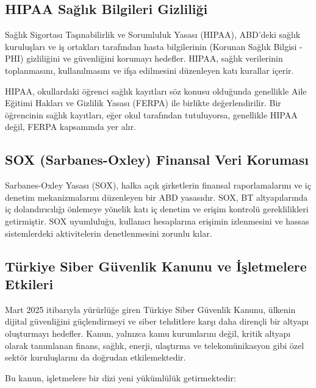 \subsection{HIPAA Sağlık Bilgileri Gizliliği}

Sağlık Sigortası Taşınabilirlik ve Sorumluluk Yasası (HIPAA), ABD'deki sağlık kuruluşları ve iş ortakları tarafından hasta bilgilerinin (Korunan Sağlık Bilgisi - PHI) gizliliğini ve güvenliğini korumayı hedefler. HIPAA, sağlık verilerinin toplanmasını, kullanılmasını ve ifşa edilmesini düzenleyen katı kurallar içerir.

HIPAA, okullardaki öğrenci sağlık kayıtları söz konusu olduğunda genellikle Aile Eğitimi Hakları ve Gizlilik Yasası (FERPA) ile birlikte değerlendirilir. Bir öğrencinin sağlık kayıtları, eğer okul tarafından tutuluyorsa, genellikle HIPAA değil, FERPA kapsamında yer alır.

\subsection{SOX (Sarbanes-Oxley) Finansal Veri Koruması}

Sarbanes-Oxley Yasası (SOX), halka açık şirketlerin finansal raporlamalarını ve iç denetim mekanizmalarını düzenleyen bir ABD yasasıdır. SOX, BT altyapılarında iç dolandırıcılığı önlemeye yönelik katı iç denetim ve erişim kontrolü gereklilikleri getirmiştir. SOX uyumluluğu, kullanıcı hesaplarına erişimin izlenmesini ve hassas sistemlerdeki aktivitelerin denetlenmesini zorunlu kılar.

\subsection{Türkiye Siber Güvenlik Kanunu ve İşletmelere Etkileri}

Mart 2025 itibarıyla yürürlüğe giren Türkiye Siber Güvenlik Kanunu, ülkenin dijital güvenliğini güçlendirmeyi ve siber tehditlere karşı daha dirençli bir altyapı oluşturmayı hedefler. Kanun, yalnızca kamu kurumlarını değil, kritik altyapı olarak tanımlanan finans, sağlık, enerji, ulaştırma ve telekomünikasyon gibi özel sektör kuruluşlarını da doğrudan etkilemektedir.

Bu kanun, işletmelere bir dizi yeni yükümlülük getirmektedir:

